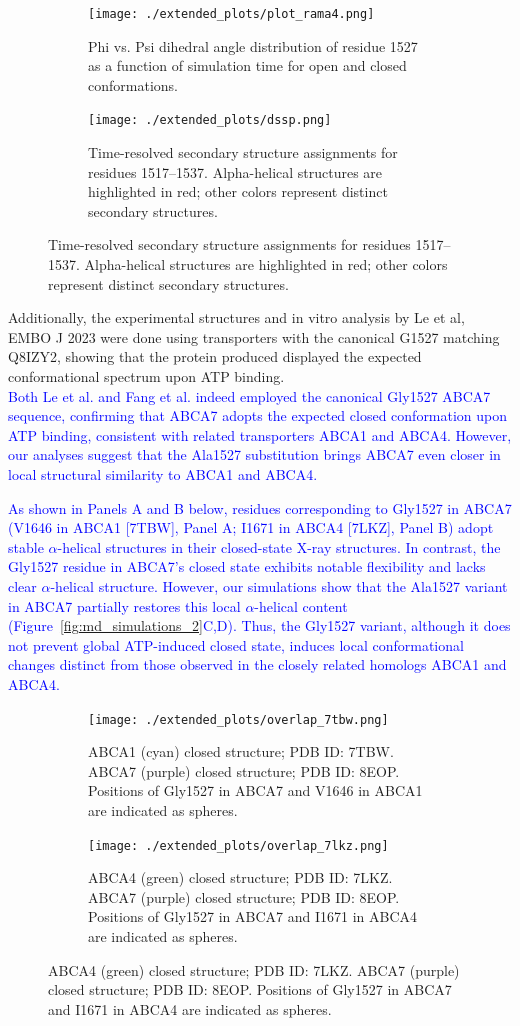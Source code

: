 \documentclass[12pt]{article}
\begin{document}
\begin{figure}[H]
	\centering
	\begin{subfigure}[t]{0.8\textwidth}
		\caption{Phi vs. Psi dihedral angle distribution of residue 1527 as a function of simulation time for open and closed conformations.}
		\texttt{[image: ./extended\_plots/plot\_rama4.png]}        
	\end{subfigure}
	\begin{subfigure}[t]{0.8\textwidth}
        \caption{Time-resolved secondary structure assignments for residues 1517–1537. Alpha-helical structures are highlighted in red; other colors represent distinct secondary structures.}
        \texttt{[image: ./extended\_plots/dssp.png]}        
    \end{subfigure}
\end{figure}

Additionally, the experimental structures and in vitro analysis by Le et al, EMBO J 2023 were done using transporters with the canonical G1527 matching Q8IZY2, showing that the protein produced displayed the expected conformational spectrum upon ATP binding.\\
\textcolor{blue}{Both Le et al. \cite{Le2023-on} and Fang et al. \cite{Fang2025} indeed  employed the canonical Gly1527 ABCA7 sequence, confirming that ABCA7 adopts the expected closed conformation upon ATP binding, consistent with related transporters ABCA1 and ABCA4. However, our analyses suggest that the Ala1527 substitution brings ABCA7 even closer in local structural similarity to ABCA1 and ABCA4.}

\textcolor{blue}{As shown in Panels A and B below, residues corresponding to Gly1527 in ABCA7 (V1646 in ABCA1 [7TBW], Panel A; I1671 in ABCA4 [7LKZ], Panel B) adopt stable $\alpha$-helical structures in their closed-state X-ray structures. In contrast, the Gly1527 residue in ABCA7’s closed state exhibits notable flexibility and lacks clear $\alpha$-helical structure. However, our simulations show that the Ala1527 variant in ABCA7 partially restores this local $\alpha$-helical content (Figure~\ref{fig:md_simulations_2}C,D). Thus, the Gly1527 variant, although it does not prevent global ATP-induced closed state, induces local conformational changes distinct from those observed in the closely related homologs ABCA1 and ABCA4.}

\begin{figure}[H]
	\begin{subfigure}[t]{0.45\textwidth}
		\caption{ABCA1 (cyan) closed structure; PDB ID: 7TBW. ABCA7 (purple) closed structure; PDB ID: 8EOP. Positions of Gly1527 in ABCA7 and V1646 in ABCA1 are indicated as spheres.}
		\texttt{[image: ./extended\_plots/overlap\_7tbw.png]}        
	\end{subfigure} 
	\hspace{0.5cm}
	\begin{subfigure}[t]{0.45\textwidth}
		\caption{ABCA4 (green) closed structure; PDB ID: 7LKZ. ABCA7 (purple) closed structure; PDB ID: 8EOP. Positions of Gly1527 in ABCA7 and I1671 in ABCA4 are indicated as spheres.}
		\texttt{[image: ./extended\_plots/overlap\_7lkz.png]}        
	\end{subfigure} 
\end{figure}
\end{document}
